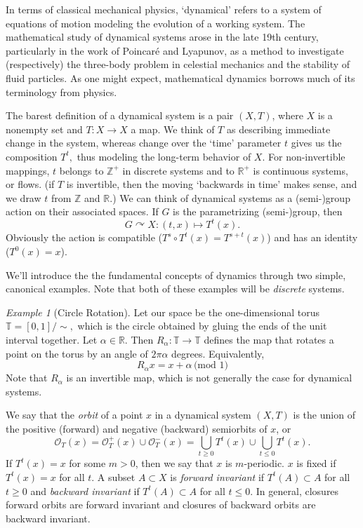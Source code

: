 \documentclass[12pt, letterpaper, oneside]{book}
\newcommand{\ga}{\ensuremath{\alpha}}
\newcommand{\R}{\mathbb{R}}
\newcommand{\Z}{\mathbb{Z}}
\newcommand{\T}{\mathbb{T}}
\theoremstyle{plain}
\theoremstyle{definition}
\theoremstyle{remark}
\newtheorem{example}{Example}
\begin{document}
In terms of classical mechanical physics, `dynamical' refers to a system of equations of motion modeling the evolution of a working system. The mathematical study of dynamical systems arose in the late 19th century, particularly in the work of Poincar\'e and Lyapunov, as a method to investigate (respectively) the three-body problem in celestial mechanics and the stability of fluid particles. As one might expect, mathematical dynamics borrows much of its terminology from physics. 


The barest definition of a dynamical system is a pair $(X, T)$, where $X$ is a nonempty set and $T:X\to X$ a map. We think of $T$ as describing immediate change in the system, whereas change over the `time' parameter $t$ gives us the composition $T^t,$ thus modeling the long-term behavior of $X.$ For non-invertible mappings, $t$ belongs to $\Z^+$ in discrete systems and to $\R^+$ is continuous systems, or flows. (if $T$ is invertible, then the moving `backwards in time' makes sense, and we draw $t$ from $\Z$ and $\R.$) We can think of dynamical systems as a (semi-)group action on their associated spaces. If $G$ is the parametrizing (semi-)group, then
\[
G\curvearrowright X: (t,x) \mapsto T^t(x).
\]
Obviously the action is compatible ($T^s \circ T^t(x) = T^{s+t}(x)$) and has an identity ($T^0(x) = x$). 

We'll introduce the the fundamental concepts of dynamics through two simple, canonical examples. Note that both of these examples will be \textit{discrete} systems. 

\begin{example}[Circle Rotation]
Let our space be the one-dimensional torus $\T = [0,1]/\sim,$ which is the circle obtained by gluing the ends of the unit interval together. Let $\ga \in \R.$ Then $R_\ga : \T \to \T$ defines the map that rotates a point on the torus by an angle of $2\pi \ga$ degrees. Equivalently,
\[
R_\ga{x} = x + \ga \,\mbox{(mod 1)}
\]
Note that $R_\ga$ is an invertible map, which is not generally the case for dynamical systems.
\end{example}


We say that the \textit{orbit} of a point $x$ in a dynamical system $(X,T)$ is the union of the positive (forward) and negative (backward) semiorbits of $x$, or
\[
\mathcal{O}_T(x) = \mathcal{O}_T^+(x) \cup \mathcal{O}_T^-(x) = \bigcup_{t \geq 0} T^t(x) \cup \bigcup_{t \leq 0} T^t(x).
\]
If $T^t(x) = x$ for some $m>0$, then we say that $x$ is $m$-periodic. $x$ is fixed if $T^t(x) = x$ for all $t.$ A subset  $A\subset X$ is \textit{forward invariant} if $T^t(A) \subset A$ for all $t \geq 0$ and \textit{backward invariant} if $T^t(A) \subset A$ for all $t \leq 0.$ In general, closures forward orbits are forward invariant and closures of backward orbits are backward invariant. 
\end{document}
